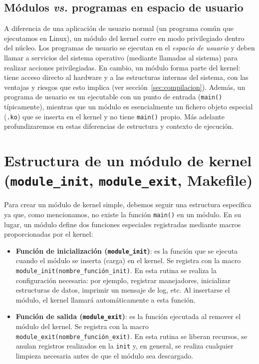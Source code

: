\subsection*{Módulos \emph{vs.} programas en espacio de usuario}
A diferencia de una aplicación de usuario normal (un programa común que ejecutamos en Linux), un módulo del kernel corre en modo privilegiado dentro del núcleo. Los programas de usuario se ejecutan en el \emph{espacio de usuario} y deben llamar a servicios del sistema operativo (mediante llamadas al sistema) para realizar acciones privilegiadas. En cambio, un módulo forma parte del kernel: tiene acceso directo al hardware y a las estructuras internas del sistema, con las ventajas y riesgos que esto implica (ver sección~\ref{sec:compilacion}). Además, un programa de usuario es un ejecutable con un punto de entrada (\lstinline!main()! típicamente), mientras que un módulo es esencialmente un fichero objeto especial (\texttt{.ko}) que se inserta en el kernel y no tiene \lstinline!main()! propio. Más adelante profundizaremos en estas diferencias de estructura y contexto de ejecución.

\section{Estructura de un módulo de kernel (\texttt{module\_init}, \texttt{module\_exit}, Makefile)}

Para crear un módulo de kernel simple, debemos seguir una estructura específica ya que, como mencionamos, no existe la función \lstinline!main()! en un módulo. En su lugar, un módulo define dos funciones especiales registradas mediante macros proporcionadas por el kernel:

\begin{itemize}
  \item \textbf{Función de inicialización (\texttt{module\_init})}: es la función que se ejecuta cuando el módulo se inserta (carga) en el kernel. Se registra con la macro \texttt{module\_init(nombre\_función\_init)}. En esta rutina se realiza la configuración necesaria: por ejemplo, registrar manejadores, inicializar estructuras de datos, imprimir un mensaje de log, etc. Al insertarse el módulo, el kernel llamará automáticamente a esta función.
  \item \textbf{Función de salida (\texttt{module\_exit})}: es la función ejecutada al remover el módulo del kernel. Se registra con la macro \texttt{module\_exit(nombre\_función\_exit)}. En esta rutina se liberan recursos, se anulan registros realizados en la \texttt{init} y, en general, se realiza cualquier limpieza necesaria antes de que el módulo sea descargado.
\end{itemize}

